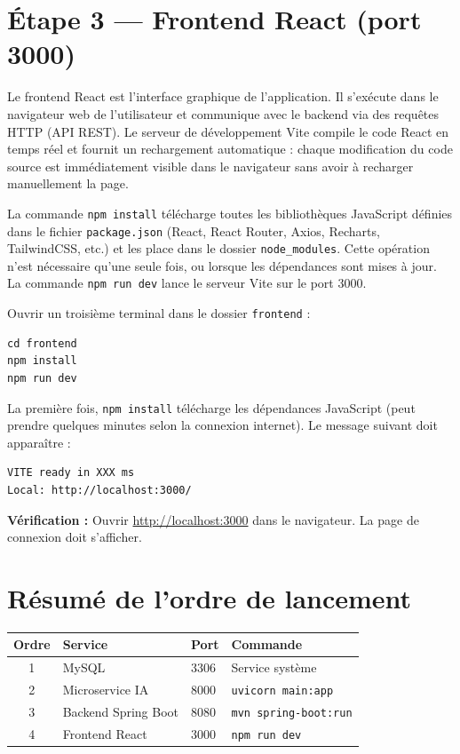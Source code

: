 \documentclass[12pt,a4paper]{report}
\begin{document}
\section{Étape 3 — Frontend React (port 3000)}

Le frontend React est l'interface graphique de l'application. Il s'exécute dans le navigateur web de l'utilisateur et communique avec le backend via des requêtes HTTP (API REST). Le serveur de développement Vite compile le code React en temps réel et fournit un rechargement automatique : chaque modification du code source est immédiatement visible dans le navigateur sans avoir à recharger manuellement la page.

La commande \texttt{npm install} télécharge toutes les bibliothèques JavaScript définies dans le fichier \texttt{package.json} (React, React Router, Axios, Recharts, TailwindCSS, etc.) et les place dans le dossier \texttt{node\_modules}. Cette opération n'est nécessaire qu'une seule fois, ou lorsque les dépendances sont mises à jour. La commande \texttt{npm run dev} lance le serveur Vite sur le port 3000.

Ouvrir un troisième terminal dans le dossier \texttt{frontend} :

\begin{verbatim}
cd frontend
npm install
npm run dev
\end{verbatim}

La première fois, \texttt{npm install} télécharge les dépendances JavaScript (peut prendre quelques minutes selon la connexion internet). Le message suivant doit apparaître :
\begin{verbatim}
VITE ready in XXX ms
Local: http://localhost:3000/
\end{verbatim}

\textbf{Vérification :} Ouvrir \url{http://localhost:3000} dans le navigateur. La page de connexion doit s'afficher.

\section{Résumé de l'ordre de lancement}

\begin{longtable}{|c|p{5cm}|p{3cm}|p{4cm}|}
\hline
\textbf{Ordre} & \textbf{Service} & \textbf{Port} & \textbf{Commande} \\
\hline
1 & MySQL & 3306 & Service système \\
\hline
2 & Microservice IA & 8000 & \texttt{uvicorn main:app} \\
\hline
3 & Backend Spring Boot & 8080 & \texttt{mvn spring-boot:run} \\
\hline
4 & Frontend React & 3000 & \texttt{npm run dev} \\
\hline
\end{longtable}
\end{document}
